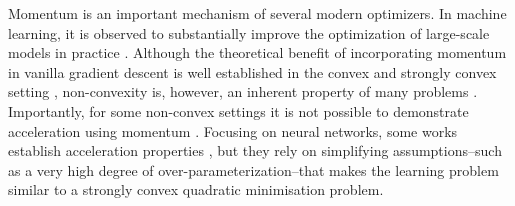 \documentclass{article}
\theoremstyle{plain}
\theoremstyle{definition}
\theoremstyle{remark}
\begin{document}
Momentum \cite{polyak1964some,nesterov1983method} is an important mechanism of several modern optimizers. In machine learning, it is observed to substantially improve the optimization of large-scale models in practice \cite{sutskever2013importance,he2016deep}.
Although the theoretical benefit of incorporating momentum in vanilla gradient descent is well established in the convex and strongly convex setting \cite{nemirovskij1983problem,nesterovbook}, non-convexity is, however, an inherent property of many problems \cite{dauphin2014identifying,ge2016matrix,ge2017no,bhojanapalli2016global,li2018visualizing}. Importantly, for some non-convex settings it is not possible to demonstrate acceleration using momentum \cite{lowerboundI,PLlowerbound}. 
Focusing on neural networks, some works establish acceleration properties \cite{wang2021modular, liu2022provable,liu2022convergence, liao2024provable}, but they rely on simplifying assumptions--such as a very high degree of over-parameterization--that makes the learning problem similar to a strongly convex quadratic minimisation problem.
\end{document}
